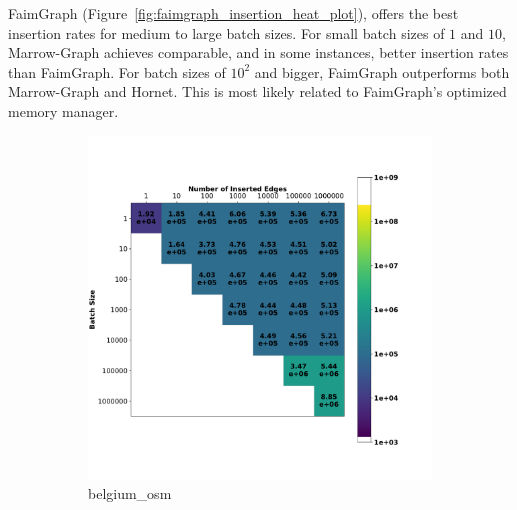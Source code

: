 FaimGraph (Figure~\ref{fig:faimgraph_insertion_heat_plot}), offers the best insertion rates for medium to large batch sizes. For small batch sizes of $1$ and $10$, Marrow-Graph achieves comparable, and in some instances, better insertion rates than FaimGraph. For batch sizes of $10^2$ and bigger, FaimGraph outperforms both Marrow-Graph and Hornet. This is most likely related to FaimGraph's optimized memory manager.

\begin{figure}
    \begin{subfigure}{0.5\textwidth}
        \centering
        \includegraphics[width=\linewidth]{Chapters/Figures/plots/lmarrow-graph_edge_update_belgium_osm_benchmark.pdf}
        \caption{belgium\_osm}
    \end{subfigure}%
    \begin{subfigure}{0.5\textwidth}
        \centering

\end{subfigure}
\end{figure}
